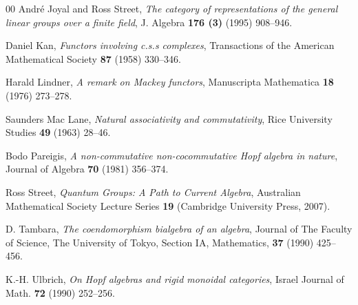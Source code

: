 \documentclass[a4paper,12pt,reqno]{amsart}
\theoremstyle{definition}
\theoremstyle{fact}
\theoremstyle{genquest}
\theoremstyle{step}
\begin{document}
\begin{thebibliography}{00}
 Andr\'e Joyal and Ross Street, \textit{The category of representations of the general linear groups over a finite field}, J. Algebra \textbf{176 (3)} (1995) 908--946.\label{repfgl}

 Daniel Kan, \textit{Functors involving c.s.s complexes}, Transactions of the American Mathematical Society \textbf{87} (1958) 330--346.\label{Kan}

 Harald Lindner, \textit{A remark on Mackey functors}, Manuscripta Mathematica \textbf{18} (1976) 273--278.\label{Lindner1976}

 Saunders Mac Lane, \textit{Natural associativity and commutativity}, Rice University Studies \textbf{49} (1963) 28--46.\label{ML1963}

 Bodo Pareigis, \textit{A non-commutative non-cocommutative Hopf algebra in nature}, Journal of Algebra \textbf{70} (1981) 356--374.\label{NHA}

 Ross Street, \textit{Quantum Groups: A Path to Current Algebra}, Australian Mathematical Society Lecture Series \textbf{19} (Cambridge University Press, 2007).\label{QG} 

 D. Tambara, \textit{The coendomorphism bialgebra of an algebra}, Journal of The Faculty of Science, The University of Tokyo, Section IA, Mathematics, \textbf{37} (1990) 425--456.\label{CBA}

 K.-H. Ulbrich, \textit{On Hopf algebras and rigid monoidal categories}, Israel Journal of 
Math. \textbf{72} (1990) 252--256.\label{Ulbrich}

\end{thebibliography}
\end{document}
